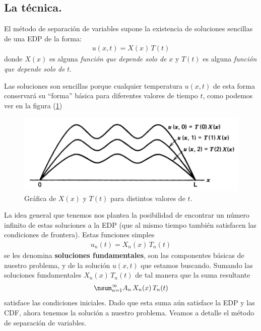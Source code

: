 \subsection{La técnica.}

El método de separación de variables supone la existencia de soluciones sencillas de una EDP de la forma:
\begin{align*}
u (x, t) =  X (x) \, T (t)
\end{align*}
donde $X (x)$ es alguna \emph{función que depende solo de} $x$ y $T (t)$ es alguna \emph{función que depende solo de} $t$.
\par
Las soluciones son sencillas porque cualquier temperatura $u (x, t)$ de esta forma conservará su \enquote{forma} básica para diferentes valores de tiempo $t$, como podemos ver en la figura (\ref{fig:figura_separacion_variables_01})
\begin{figure}[H]
    \centering
    \includegraphics[scale=0.4]{Imagenes/Separacion_Variables_01.png}
    \caption{Gráfica de $X(x)$ y $T(t)$ para distintos valores de $t$.}
    \label{fig:figura_separacion_variables_01}
\end{figure}
La idea general que tenemos nos plantea la posibilidad de encontrar un número infinito de estas soluciones a la EDP (que al mismo tiempo también satisfacen las condiciones de frontera). Estas funciones simples
\begin{align*}
u_{n} (t) = X_{n} (x) \, T_{n} (t)
\end{align*}
se les denomina \textbf{soluciones fundamentales}, son las componentes básicas de nuestro problema, y de la solución $u (x, t)$ que estamos buscando. Sumando las soluciones fundamentales $X_{n} (x) \, T_{n} (t)$ de tal manera que la suma resultante
\begin{align*}
\nsum_{n=1}^{\infty} A_{n} \, X_{n} (x) \, T_{n} (t)
\end{align*}
satisface las condiciones iniciales. Dado que esta suma aún satisface la EDP y las CDF, ahora tenemos la solución a nuestro problema. Veamos a detalle el método de separación de variables.

